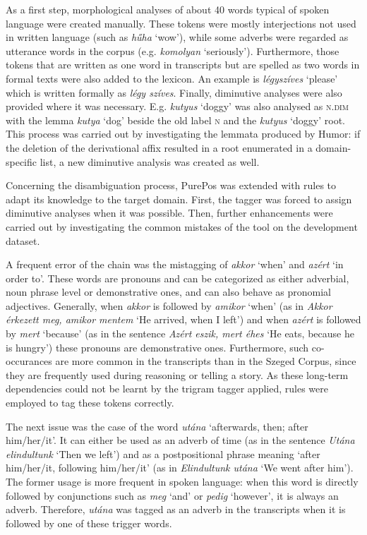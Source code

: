 As a first step, morphological analyses of about 40 words typical of spoken language were created manually. 
These tokens were mostly interjections not used in written language (such as \textit{hűha} `wow’), while some adverbs were regarded as utterance words in the corpus (e.g. \textit{komolyan} `seriously’). 
Furthermore, those tokens that are written as one word in transcripts but are spelled as two words in formal texts were also added to the lexicon. 
An example is \textit{légyszíves} `please’ which is written formally as \textit{légy szíves}. Finally, diminutive analyses were also provided where it was necessary. 
E.g. \textit{kutyus} `doggy’ was also analysed as \textsc{n.dim} with the lemma \textit{kutya} `dog’ beside the old label \textsc{n} and the \textit{kutyus} `doggy’ root. This process was carried out by investigating the lemmata produced by Humor: if the deletion of the derivational affix resulted in a root enumerated in a domain-specific list, a new diminutive analysis was created as well. 

Concerning the disambiguation process, PurePos was extended with rules to adapt its knowledge to the target domain. 
First, the tagger was forced to assign diminutive analyses when it was possible. 
Then, further enhancements were carried out by investigating the common mistakes of the tool on the development dataset.

A frequent error of the chain was the mistagging of \textit{akkor} `when’ and \textit{azért} `in order to’. 
These words are pronouns and can be categorized as either adverbial, noun phrase level or demonstrative ones, and can also behave as pronomial adjectives. 
Generally, when \textit{akkor} is followed by \textit{amikor} `when’ (as in \textit{Akkor érkezett meg, amikor mentem} `He arrived, when I left’) and when \textit{azért} is followed by \textit{mert} `because’ (as in the sentence \textit{Azért eszik, mert éhes} `He eats, because he is hungry’) these pronouns are demonstrative ones. 
Furthermore, such co-occurances are more common in the transcripts than in the Szeged Corpus, since they are frequently used during reasoning or telling a story. 
As these long-term dependencies could not be learnt by the trigram tagger applied, rules were employed to tag these tokens correctly.

The next issue was the case of the word \textit{utána} `afterwards, then; after him/her/it’. 
It can either be used as an adverb of time (as in the sentence \textit{Utána elindultunk} `Then we left’) and as a postpositional phrase meaning `after him/her/it, following him/her/it’ (as in \textit{Elindultunk utána} `We went after him’). 
The former usage is more frequent in spoken language: when this word is directly followed by conjunctions such as \textit{meg} `and’ or \textit{pedig} `however’, it is always an adverb. 
Therefore, \textit{utána} was tagged as an adverb in the transcripts when it is followed by one of these trigger words. 

